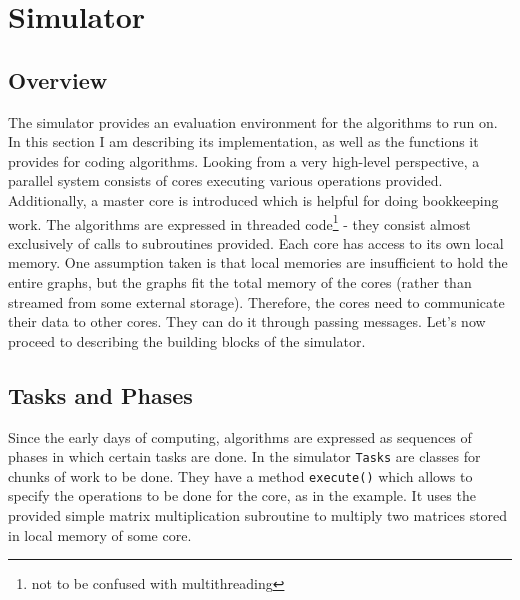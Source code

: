 \documentclass[12pt,a4paper,twoside,openright]{report}
\begin{document}

\section{Simulator}
\subsection{Overview}
The simulator provides an evaluation environment for the algorithms to run on. In this section I am describing its implementation, as well as the functions it provides for coding algorithms. Looking from a very high-level perspective, a parallel system consists of cores executing various operations provided. Additionally, a master core is introduced which is helpful for doing bookkeeping work.
The algorithms are expressed in threaded code\footnote{not to be confused with multithreading} - they consist almost exclusively of calls to subroutines provided. Each core has access to its own local memory. One assumption taken is that local memories are insufficient to hold the entire graphs, but the graphs fit the total memory of the cores (rather than streamed from some external storage). Therefore, the cores need to communicate their data to other cores. They can do it through passing messages. Let's now proceed to describing the building blocks of the simulator.

\subsection{Tasks and Phases}
Since the early days of computing, algorithms are expressed as sequences of phases in which certain tasks are done. In the simulator \texttt{Tasks} are classes for chunks of work to be done. They have a method \texttt{execute()} which allows to specify the operations to be done for the core, as in the example. It uses the provided simple matrix multiplication subroutine to multiply two matrices stored in local memory of some core. 
\end{document}
